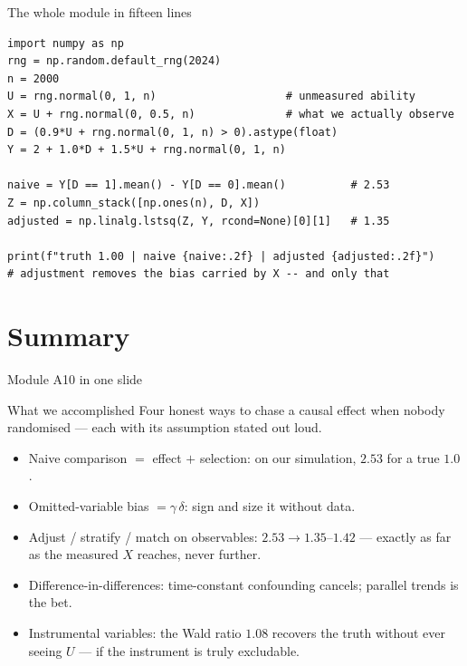 \documentclass[aspectratio=169,11pt]{beamer}
\begin{document}
\begin{frame}[fragile]{The whole module in fifteen lines}
\begin{lstlisting}
import numpy as np
rng = np.random.default_rng(2024)
n = 2000
U = rng.normal(0, 1, n)                    # unmeasured ability
X = U + rng.normal(0, 0.5, n)              # what we actually observe
D = (0.9*U + rng.normal(0, 1, n) > 0).astype(float)
Y = 2 + 1.0*D + 1.5*U + rng.normal(0, 1, n)

naive = Y[D == 1].mean() - Y[D == 0].mean()          # 2.53
Z = np.column_stack([np.ones(n), D, X])
adjusted = np.linalg.lstsq(Z, Y, rcond=None)[0][1]   # 1.35

print(f"truth 1.00 | naive {naive:.2f} | adjusted {adjusted:.2f}")
# adjustment removes the bias carried by X -- and only that
\end{lstlisting}
\end{frame}

\section{Summary}

\begin{frame}{Module A10 in one slide}
  \begin{block}{What we accomplished}
    Four honest ways to chase a causal effect when nobody randomised --- each with
    its assumption stated out loud.
  \end{block}
  \begin{itemize}
    \item Naive comparison $=$ effect $+$ selection: on our simulation, $2.53$
          for a true $1.0$.
    \item Omitted-variable bias $= \gamma\,\delta$: sign and size it without data.
    \item Adjust / stratify / match on observables: $2.53 \to 1.35$--$1.42$ ---
          exactly as far as the measured $X$ reaches, never further.
    \item Difference-in-differences: time-constant confounding cancels; parallel
          trends is the bet.
    \item Instrumental variables: the Wald ratio $1.08$ recovers the truth without
          ever seeing $U$ --- if the instrument is truly excludable.
  \end{itemize}
\end{frame}
\end{document}
